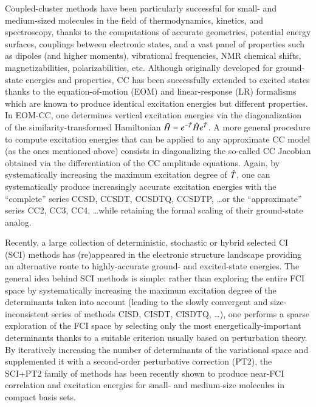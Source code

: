 \documentclass[aip,jcp,reprint,noshowkeys,superscriptaddress]{revtex4-1}
\newcommand{\hH}{\Hat{H}}
\newcommand{\hT}{\Hat{T}}
\newcommand{\bH}{\Bar{H}}
\begin{document}
Coupled-cluster methods have been particularly successful for small- and medium-sized molecules in the field of thermodynamics, kinetics, and spectroscopy, thanks to the computations of accurate geometries, potential energy surfaces, couplings between electronic states, and a vast panel of properties such as dipoles (and higher moments), vibrational frequencies, NMR chemical shifts, magnetizabilities, polarizabilities, etc.
Although originally developed for ground-state energies and properties, CC has been successfully extended to excited states thanks to the equation-of-motion (EOM) and linear-response (LR) formalisms which are known to produce identical excitation energies but different properties.
In EOM-CC, one determines vertical excitation energies via the diagonalization of the similarity-transformed Hamiltonian $\bH = e^{-\hT} \hH e^{\hT}$.
A more general procedure to compute excitation energies that can be applied to any approximate CC model (as the ones mentioned above) consists in diagonalizing the so-called CC Jacobian obtained via the differentiation of the CC amplitude equations.
Again, by systematically increasing the maximum excitation degree of $\hT$, one can systematically produce increasingly accurate excitation energies with the ``complete'' series CCSD, CCSDT, CCSDTQ, CCSDTP, \ldots or the ``approximate'' series CC2, CC3, CC4, \ldots while retaining the formal scaling of their ground-state analog.

Recently, a large collection of deterministic, stochastic or hybrid selected CI (SCI) methods has (re)appeared in the electronic structure landscape providing an alternative route to highly-accurate ground- and excited-state energies.
The general idea behind SCI methods is simple: rather than exploring the entire FCI space by systematically increasing the maximum excitation degree of the determinants taken into account (leading to the slowly convergent and size-inconsistent series of methods CISD, CISDT, CISDTQ, \ldots), one performs a sparse exploration of the FCI space by selecting only the most energetically-important determinants thanks to a suitable criterion usually based on perturbation theory.
By iteratively increasing the number of determinants of the variational space and supplemented it with a second-order perturbative correction (PT2), the SCI+PT2 family of methods has been recently shown to produce near-FCI correlation and excitation energies for small- and medium-size molecules in compact basis sets.
\end{document}
